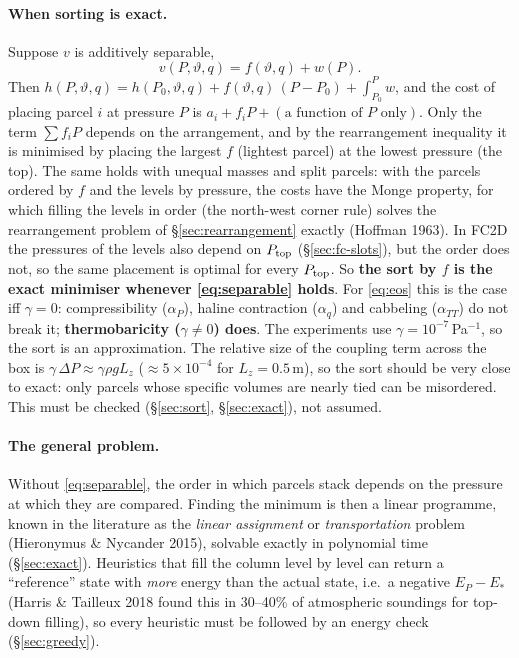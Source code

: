 \documentclass[11pt,a4paper]{article}
\newcommand{\vt}{\vartheta}
\newcommand{\Ptop}{P_{\rm top}}
\begin{document}
\paragraph{When sorting is exact.} Suppose $v$ is additively separable,
\begin{equation}
  v(P,\vt,q)=f(\vt,q)+w(P).
  \label{eq:separable}
\end{equation}
Then $h(P,\vt,q)=h(P_0,\vt,q)+f(\vt,q)\,(P-P_0)+\int_{P_0}^{P}w$, and the cost of placing parcel $i$ at pressure $P$ is
$a_i+f_i P+(\text{a function of }P\text{ only})$. Only the term $\sum f_iP$ depends on the arrangement, and by the
rearrangement inequality it is minimised by placing the largest $f$ (lightest parcel) at the lowest pressure (the top). The
same holds with unequal masses and split parcels: with the parcels ordered by $f$ and the levels by pressure, the costs have
the Monge property, for which filling the levels in order (the north-west corner rule) solves the rearrangement problem of
\S\ref{sec:rearrangement} exactly (Hoffman 1963). In FC2D the pressures of the levels also depend on $\Ptop$
(\S\ref{sec:fc-slots}), but the order does not, so the same placement is optimal for every $\Ptop$. So \textbf{the sort by $f$ is
the exact minimiser whenever \eqref{eq:separable} holds}. For \eqref{eq:eos} this is the case iff $\gamma=0$:
compressibility ($\alpha_P$), haline contraction ($\alpha_q$) and cabbeling ($\alpha_{TT}$) do not break it;
\textbf{thermobaricity ($\gamma\neq0$) does}. The experiments use $\gamma=10^{-7}\,$Pa$^{-1}$, so the sort is an
approximation. The relative size of the coupling term across the box is $\gamma\,\Delta P\approx\gamma\rho g L_z$
($\approx5\times10^{-4}$ for $L_z=0.5\,$m), so the sort should be very close to exact: only parcels whose specific volumes are
nearly tied can be misordered. This must be checked (\S\ref{sec:sort}, \S\ref{sec:exact}), not assumed.

\paragraph{The general problem.} Without \eqref{eq:separable}, the order in which parcels stack depends on the pressure at
which they are compared. Finding the minimum is then a linear programme, known in the literature as the \emph{linear assignment} or \emph{transportation} problem
(Hieronymus \& Nycander 2015), solvable exactly in polynomial time (\S\ref{sec:exact}). Heuristics that fill the column
level by level can return a ``reference'' state with \emph{more} energy than the actual state, i.e.\ a negative $E_P-E_*$ (Harris \&
Tailleux 2018 found this in 30--40\% of atmospheric soundings for top-down filling), so every heuristic must be followed by
an energy check (\S\ref{sec:greedy}).
\end{document}
